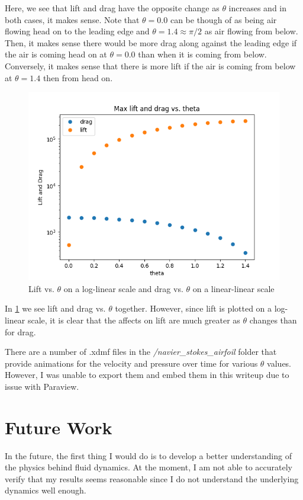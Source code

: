 \documentclass[12pt]{article}
\theoremstyle{definition}
\numberwithin{equation}{section}
\begin{document}
	Here, we see that lift and drag have the opposite change as $\theta$ increases and in both cases, it makes sense. Note that $\theta = 0.0$ can be though of as being air flowing head on to the leading edge and $\theta = 1.4 \approx \pi/2$ as  air flowing from below. Then, it makes sense there would be more drag along against the leading edge if the air is coming head on at $\theta  = 0.0$ than when it is coming from below. Conversely, it makes sense that there is more lift if the air is coming from below at $\theta = 1.4$ then from head on.
	
	\begin{figure}[H]
		\centering
		\includegraphics[scale=0.5]{../max_both.png}
		\caption{Lift vs. $\theta$ on a log-linear scale and drag vs. $\theta$ on a linear-linear scale}
		\label{fig:dragandlift}
	\end{figure}
	In \cref{fig:dragandlift} we see lift and drag vs. $\theta$ together. However, since lift is plotted on a log-linear scale, it is clear that the affects on lift are much greater as $\theta$ changes than for drag.
	
	There are a number of .xdmf files in the \textit{/navier\_stokes\_airfoil} folder that provide animations for the velocity and pressure over time for various $\theta$ values. However, I was unable to export them and embed them in this writeup due to issue with Paraview.
	
	\section*{Future Work}
	In the future, the first thing I would do is to develop a better understanding of the physics behind fluid dynamics. At the moment, I am not able to accurately verify that my results seems reasonable since I do not understand the underlying dynamics well enough. 
	
\end{document}
